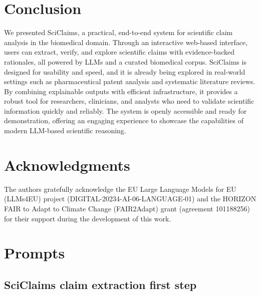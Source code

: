 \documentclass[11pt]{article}
\begin{document}
\section{Conclusion}
We presented SciClaims, a practical, end-to-end system for scientific claim analysis in the biomedical domain. Through an interactive web-based interface, users can extract, verify, and explore scientific claims with evidence-backed rationales, all powered by LLMs and a curated biomedical corpus. SciClaims is designed for usability and speed, and it is already being explored in real-world settings such as pharmaceutical patent analysis and systematic literature reviews. By combining explainable outputs with efficient infrastructure, it provides a robust tool for researchers, clinicians, and analysts who need to validate scientific information quickly and reliably. The system is openly accessible and ready for demonstration, offering an engaging experience to showcase the capabilities of modern LLM-based scientific reasoning.


\clearpage
\section*{Acknowledgments}
The authors gratefully acknowledge the EU Large Language Models for EU (LLMs4EU) project (DIGITAL-20234-AI-06-LANGUAGE-01) and the HORIZON FAIR to Adapt to Climate Change (FAIR2Adapt) grant (agreement 101188256) for their support during the development of this work.   

%



\clearpage
\appendix

\section{Prompts}
\label{sec:prompts}

\subsection{SciClaims claim extraction first step}
\end{document}
